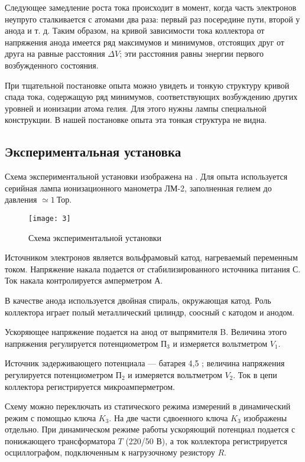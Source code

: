 \documentclass[a4paper, 12pt]{article}
\begin{document}
Следующее замедление роста тока происходит в момент, когда часть
электронов неупруго сталкивается с атомами два раза: первый раз
посередине пути, второй у анода и т. д. Таким образом, на кривой
зависимости тока коллектора от напряжения анода имеется ряд максимумов
и минимумов, отстоящих друг от друга на равные расстояния $\Delta V$; эти
расстояния равны энергии первого возбужденного состояния.

При тщательной постановке опыта можно увидеть и тонкую структуру
кривой спада тока, содержащую ряд минимумов, соответствующих
возбуждению других уровней и ионизации атома гелия. Для этого нужны
лампы специальной конструкции. В нашей постановке опыта эта тонкая
структура не видна.

\subsection{Экспериментальная установка}
Схема экспериментальной установки изображена на . Для опыта
используется серийная лампа ионизационного манометра ЛМ-2, 
заполненная гелием до давления $\simeq 1\ \text{Тор}$.

\begin{figure}[H]
    \texttt{[image: 3]} 
    \caption{Схема экспериментальной установки}
    \label{fig:3}
\end{figure}

Источником
электронов является вольфрамовый катод, нагреваемый переменным током.
Напряжение накала подается от стабилизированного источника питания
С. Ток накала контролируется амперметром А.

В качестве анода используется двойная спираль, окружающая катод. Роль
коллектора играет полый металлический цилиндр, соосный с катодом и
анодом.

Ускоряющее напряжение подается на анод от выпрямителя B. Величина
этого напряжения регулируется потенциометром $\text{П}_{3}$ и измеряется
вольтметром $V_1$. 


Источник задерживающего потенциала — батарея 
4,5 ; величина напряжения регулируется 
потенциометром $\text{П}_{2}$ и измеряется вольтметром $V_2$. Ток в
цепи коллектора
регистрируется микроамперметром.

Схему можно переключать из статического режима измерений в
динамический режим с помощью ключа $K_3$. На  две части сдвоенного
ключа $K_3$ изображены отдельно. При динамическом режиме работы
ускоряющий потенциал подается с понижающего трансформатора $T$ (220/50
$\text{В}$), а ток коллектора регистрируется осциллографом,
подключенным к нагрузочному резистору $R$. 
\end{document}

